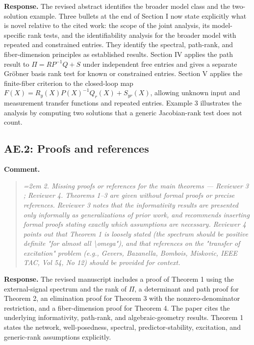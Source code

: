 \documentclass[11pt]{article}
\begin{document}
\textbf{Response.} The revised abstract identifies the broader model class and the two-solution example. Three bullets at the end of Section I now state explicitly what is novel relative to the cited work: the scope of the joint analysis, its model-specific rank tests, and the identifiability analysis for the broader model with repeated and constrained entries. They identify the spectral, path-rank, and fiber-dimension principles as established results. Section IV applies the path result to $\Pi=RP^{-1}Q+S$ under independent free entries and gives a separate Gr\"obner basis rank test for known or constrained entries. Section V applies the finite-fiber criterion to the closed-loop map $F(X)=R_y(X)P(X)^{-1}Q_r(X)+S_{yr}(X)$, allowing unknown input and measurement transfer functions and repeated entries. Example 3 illustrates the analysis by computing two solutions that a generic Jacobian-rank test does not count.

\subsection*{AE.2: Proofs and references}
\textbf{Comment.}
\begin{quote}\itshape\emergencystretch=2em
2. Missing proofs or references for the main theorems --- Reviewer 3 ; Reviewer 4. Theorems 1--3 are given without formal proofs or precise references. Reviewer 3 notes that the informativity results are presented only informally as generalizations of prior work, and recommends inserting formal proofs stating exactly which assumptions are necessary. Reviewer 4 points out that Theorem 1 is loosely stated (the spectrum should be positive definite "for almost all \textbackslash{}omega"), and that references on the "transfer of excitation" problem (e.g., Gevers, Bazanella, Bombois, Miskovic, IEEE TAC, Vol 54, No 12) should be provided for context.
\end{quote}

\textbf{Response.} The revised manuscript includes a proof of Theorem 1 using the external-signal spectrum and the rank of $\Pi$, a determinant and path proof for Theorem 2, an elimination proof for Theorem 3 with the nonzero-denominator restriction, and a fiber-dimension proof for Theorem 4. The paper cites the underlying informativity, path-rank, and algebraic-geometry results.
Theorem 1 states the network, well-posedness, spectral, predictor-stability,
excitation, and generic-rank assumptions explicitly.
\end{document}
